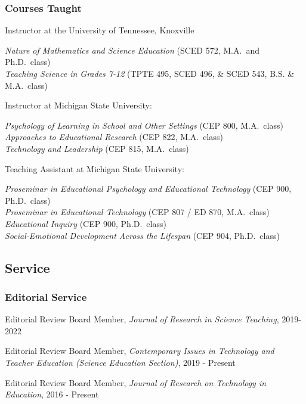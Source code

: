 \documentclass[14,]{article}
\begin{document}
\hypertarget{courses-taught}{%
\subsubsection{Courses Taught}\label{courses-taught}}

Instructor at the University of Tennessee, Knoxville

\emph{Nature of Mathematics and Science Education} (SCED 572, M.A.~and
Ph.D.~class)\\
\emph{Teaching Science in Grades 7-12} (TPTE 495, SCED 496, \& SCED 543,
B.S. \& M.A.~class)

Instructor at Michigan State University:

\emph{Psychology of Learning in School and Other Settings} (CEP 800,
M.A.~class)\\
\emph{Approaches to Educational Research} (CEP 822, M.A.~class)\\
\emph{Technology and Leadership} (CEP 815, M.A.~class)

Teaching Assistant at Michigan State University:

\emph{Proseminar in Educational Psychology and Educational Technology}
(CEP 900, Ph.D.~class)\\
\emph{Proseminar in Educational Technology} (CEP 807 / ED 870,
M.A.~class)\\
\emph{Educational Inquiry} (CEP 900, Ph.D.~class)\\
\emph{Social-Emotional Development Across the Lifespan} (CEP 904,
Ph.D.~class)

\hypertarget{service}{%
\subsection{Service}\label{service}}

\hypertarget{editorial-service}{%
\subsubsection{Editorial Service}\label{editorial-service}}

Editorial Review Board Member, \emph{Journal of Research in Science
Teaching}, 2019-2022

Editorial Review Board Member, \emph{Contemporary Issues in Technology
and Teacher Education (Science Education Section)}, 2019 - Present

Editorial Review Board Member, \emph{Journal of Research on Technology
in Education}, 2016 - Present
\end{document}

